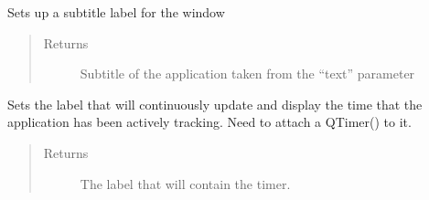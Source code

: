 \documentclass[letterpaper,10pt,english]{sphinxmanual}
\begin{document}
\begin{fulllineitems}
\begin{fulllineitems}
\begin{quote}
\begin{description}
\end{description}\end{quote}

\end{fulllineitems}


\begin{fulllineitems}
\label{\detokenize{index:src.Views.View_TrackingScreen.TrackingWindow.setSubTitle}}
Sets up a subtitle label for the window
\begin{quote}\begin{description}
\item[{Returns}] \leavevmode
Subtitle of the application taken from the “text” parameter

\end{description}\end{quote}

\end{fulllineitems}


\begin{fulllineitems}
\label{\detokenize{index:src.Views.View_TrackingScreen.TrackingWindow.setTimerLabel}}
Sets the label that will continuously update and display the time that the application has been
actively tracking. Need to attach a QTimer() to it.
\begin{quote}\begin{description}
\item[{Returns}] \leavevmode
The label that will contain the timer.

\end{description}\end{quote}

\end{fulllineitems}



\end{fulllineitems}
\end{document}
